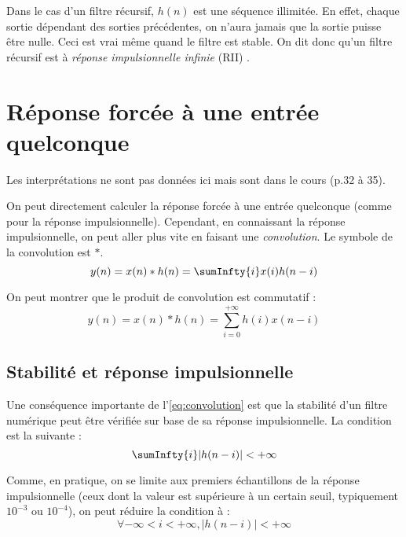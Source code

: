         Dans le cas d'un filtre récursif, $h(n)$ est une séquence illimitée. En effet, chaque sortie dépendant des sorties précédentes, on n'aura jamais que la sortie puisse être nulle. Ceci est vrai même quand le filtre est stable. On dit donc qu'un filtre récursif est à \textit{réponse impulsionnelle infinie} (RII) .

    \section{Réponse forcée à une entrée quelconque}
        \begin{remarque}
            Les interprétations ne sont pas données ici mais sont dans le cours (p.32 à 35).
        \end{remarque}
        On peut directement calculer la réponse forcée à une entrée quelconque (comme pour la réponse impulsionnelle). Cependant, en connaissant la réponse impulsionnelle, on peut aller plus vite en faisant une \textit{convolution}. Le symbole de la convolution est $*$.
        \begin{equation}
            y(n) = x(n) * h(n) = \sumInfty{i} x(i) h(n-i)
            \label{eq:convolution}
        \end{equation}

        On peut montrer que le produit de convolution est commutatif :
        \begin{equation}
            y(n) = x(n) * h(n) = \sum_{i=0}^{+\infty} h(i) x(n-i)
            \label{eq:convolutionDuale}
        \end{equation}

        \subsection{Stabilité et réponse impulsionnelle}
            Une conséquence importante de l'\autoref{eq:convolution} est que la stabilité d'un filtre numérique peut être vérifiée sur base de sa réponse impulsionnelle. La condition est la suivante :
            $$
                \sumInfty{i} |h(n-i)| < +\infty
            $$

            Comme, en pratique, on se limite aux premiers échantillons de la réponse impulsionnelle (ceux dont la valeur est supérieure à un certain seuil, typiquement $10^{-3}$ ou $10^{-4}$), on peut réduire la condition à :
            $$
                \forall -\infty < i < +\infty, |h(n-i)| < +\infty
            $$

